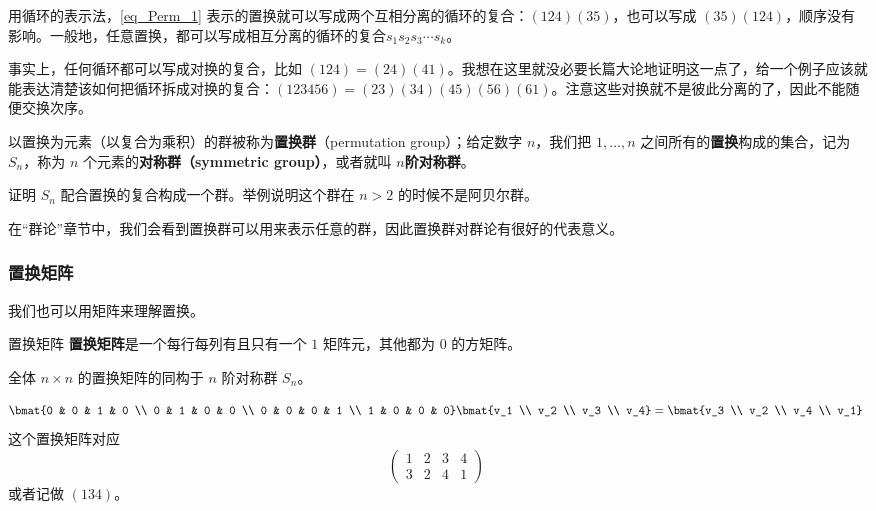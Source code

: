 用循环的表示法，\autoref{eq_Perm_1}  表示的置换就可以写成两个互相分离的循环的复合：$(1 2 4)(3 5)$，也可以写成 $(3 5 )(1 2 4)$，顺序没有影响。一般地，任意置换，都可以写成相互分离的循环的复合$s_1s_2s_3\cdots s_k$。

事实上，任何循环都可以写成对换的复合，比如 $(1 2 4) = (2 4)(4 1)$。我想在这里就没必要长篇大论地证明这一点了，给一个例子应该就能表达清楚该如何把循环拆成对换的复合：$(1 2 3 4 5 6) = (2 3)(3 4)(4 5)(5 6)(6 1)$。注意这些对换就不是彼此分离的了，因此不能随便交换次序。

以置换为元素（以复合为乘积）的群被称为\textbf{置换群}（permutation group）；给定数字 $n$，我们把 $1, \dots, n$ 之间所有的\textbf{置换}构成的集合，记为 $S_n$，称为 $n$ 个元素的\textbf{对称群（symmetric group）}，或者就叫 $n$\textbf{阶对称群}。

\begin{exercise}{}
证明 $S_n$ 配合置换的复合构成一个群。举例说明这个群在 $n>2$ 的时候不是阿贝尔群。
\end{exercise}

在“群论”章节中，我们会看到置换群可以用来表示任意的群，因此置换群对群论有很好的代表意义。

\subsubsection{置换矩阵}

我们也可以用矩阵来理解置换。

\begin{definition}{置换矩阵}\label{def_Perm_1}
\textbf{置换矩阵}是一个每行每列有且只有一个 $1$ 矩阵元，其他都为 $0$ 的方矩阵。
\end{definition}

\begin{theorem}{}\label{the_Perm_1}
全体 $n \times n$ 的置换矩阵的同构于 $n$ 阶对称群 $S_n$。
\end{theorem}

\begin{example}{}
\begin{equation}
\bmat{0 & 0 & 1 & 0 \\
0 & 1 & 0 & 0 \\
0 & 0 & 0 & 1 \\
1 & 0 & 0 & 0} \bmat{v_1 \\ v_2 \\ v_3 \\ v_4} = \bmat{v_3 \\ v_2 \\ v_4 \\ v_1}~
\end{equation}
这个置换矩阵对应
\begin{equation}
\begin{pmatrix}1&2&3&4\\3&2&4&1\end{pmatrix}~
\end{equation}
或者记做 $(1 3 4)$。
\end{example}

